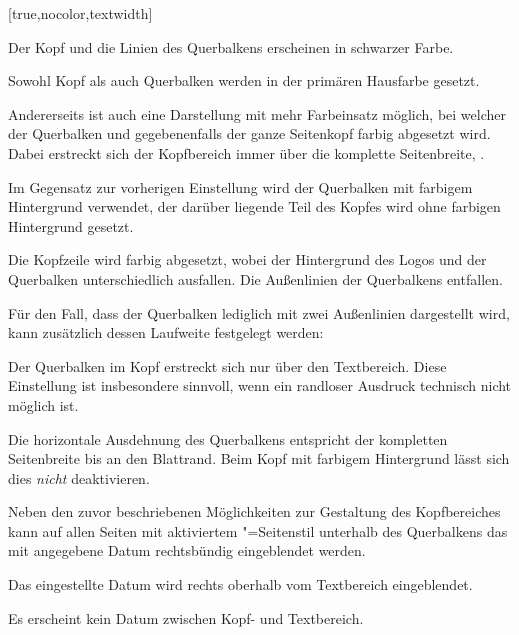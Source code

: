\begin{Declaration*}{}
\begin{Declaration*}{}
\begin{Declaration*}{}
\begin{Declaration}[%
  v2.03;%
  v2.04!\Option{cdhead=barcolor}:nur farbig abgesetzter Querbalken;%
  v2.05!\Option{cdhead=date}:Datum zwischen Kopf- und Textbereich;%
]{}[true,nocolor,textwidth]
\begin{values}{}
  Der Kopf und die Linien des Querbalkens erscheinen in schwarzer Farbe.
\item[lightcolor/pale]
  Sowohl Kopf als auch Querbalken werden in der primären Hausfarbe gesetzt.
\end{values}
%
Andererseits ist auch eine Darstellung mit mehr Farbeinsatz möglich, bei 
welcher der Querbalken und gegebenenfalls der ganze Seitenkopf farbig 
abgesetzt wird. Dabei erstreckt sich der Kopfbereich immer über die komplette 
Seitenbreite, .
%
\begin{values}{}
\item[barcolor]
  Im Gegensatz zur vorherigen Einstellung wird der Querbalken mit farbigem 
  Hintergrund verwendet, der darüber liegende Teil des Kopfes wird ohne 
  farbigen Hintergrund gesetzt.
\item[bicolor/bichrome]
  Die Kopfzeile wird farbig abgesetzt, wobei der Hintergrund des Logos und der 
  Querbalken unterschiedlich ausfallen. Die Außenlinien der Querbalkens 
  entfallen.
\end{values}
%
Für den Fall, dass der Querbalken lediglich mit zwei Außenlinien dargestellt 
wird, kann zusätzlich dessen Laufweite festgelegt werden:
%
\begin{values}{}
\item[textwidth/slim]
  Der Querbalken im Kopf erstreckt sich nur über den Textbereich. Diese 
  Einstellung ist insbesondere sinnvoll, wenn ein randloser Ausdruck technisch 
  nicht möglich ist. 
\item[paperwidth/wide]
  Die horizontale Ausdehnung des Querbalkens entspricht der kompletten 
  Seitenbreite bis an den Blattrand. Beim Kopf mit farbigem Hintergrund lässt 
  sich dies \emph{nicht} deaktivieren.
\end{values}
%
Neben den zuvor beschriebenen Möglichkeiten zur Gestaltung des Kopfbereiches 
kann auf allen Seiten mit aktiviertem "=Seitenstil 
unterhalb des Querbalkens das mit  angegebene Datum rechtsbündig 
eingeblendet werden.
%
\begin{values}{}
\item[date/showdate]
  Das eingestellte Datum wird rechts oberhalb vom Textbereich eingeblendet.
\item[nodate/hidedate]
  Es erscheint kein Datum zwischen Kopf- und Textbereich.
\end{values}
\end{Declaration}


\end{Declaration*}
\end{Declaration*}
\end{Declaration*}

